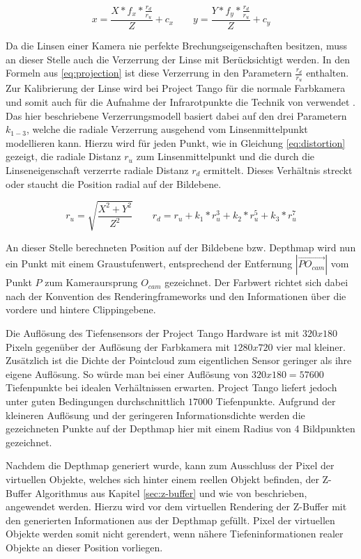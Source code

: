 \begin{equation}\label{eq:projection}
x = \frac{X* f_x * \frac{r_d}{r_u}}{Z}  + c_x
\qquad
y = \frac{Y* f_y * \frac{r_d}{r_u}}{Z}  + c_y
\end{equation}

Da die Linsen einer Kamera nie perfekte Brechungseigenschaften besitzen, muss an dieser Stelle auch die Verzerrung der Linse mit Berücksichtigt werden. In den Formeln aus \ref{eq:projection} ist diese Verzerrung in den Parametern \(\frac{r_d}{r_u}\) enthalten. Zur Kalibrierung der Linse wird bei Project Tango für die normale Farbkamera und somit auch für die Aufnahme der Infrarotpunkte die Technik von \citet{tsai1987versatile} verwendet  \citep{Tango90:online}. Das hier beschriebene Verzerrungsmodell basiert dabei auf den drei Parametern \(k_{1-3}\), welche die radiale Verzerrung ausgehend vom Linsenmittelpunkt modellieren kann. Hierzu wird für jeden Punkt, wie in Gleichung \ref{eq:distortion} gezeigt, die radiale Distanz \(r_u\) zum Linsenmittelpunkt und die durch die Linseneigenschaft verzerrte radiale Distanz \(r_d\) ermittelt. Dieses Verhältnis streckt oder staucht die Position radial auf der Bildebene.


\begin{equation} \label{eq:distortion}
r_u = \sqrt{\frac{X^2 + Y^2}{ Z^2}} 
\qquad
r_d = r_u + k_1 * r_u^3 + k_2 * r_u^5 + k_3 * r_u^7
\end{equation}

An dieser Stelle berechneten Position auf der Bildebene bzw. Depthmap wird nun ein Punkt mit einem Graustufenwert, entsprechend der Entfernung \(|\overrightarrow{PO_{cam}}|\) vom Punkt \(P\) zum Kameraursprung \(O_{cam}\) gezeichnet. Der Farbwert richtet sich dabei nach der Konvention des Renderingframeworks und den Informationen über die vordere und hintere Clippingebene.

Die Auflösung des Tiefensensors der Project Tango Hardware ist mit \(320x180\) Pixeln gegenüber der Auflösung der Farbkamera mit \(1280x720\) vier mal kleiner. Zusätzlich ist die Dichte der Pointcloud zum eigentlichen Sensor geringer als ihre eigene Auflösung. So würde man bei einer Auflösung von \(320x180 = 57600\) Tiefenpunkte bei idealen Verhältnissen erwarten. Project Tango liefert jedoch unter guten Bedingungen durchschnittlich \(17000\) Tiefenpunkte. Aufgrund der kleineren Auflösung und der geringeren Informationsdichte werden die gezeichneten Punkte auf der Depthmap hier mit einem Radius von 4 Bildpunkten gezeichnet. 

Nachdem die Depthmap generiert wurde, kann zum Ausschluss der Pixel der virtuellen Objekte, welches sich hinter einem reellen Objekt befinden, der Z-Buffer Algorithmus aus Kapitel \ref{sec:z-buffer} und wie von \citet{wloka1995resolving} beschrieben, angewendet werden. Hierzu wird vor dem virtuellen Rendering der Z-Buffer mit den generierten Informationen aus der Depthmap gefüllt. Pixel der virtuellen Objekte werden somit nicht gerendert, wenn nähere Tiefeninformationen realer Objekte an dieser Position vorliegen. 


